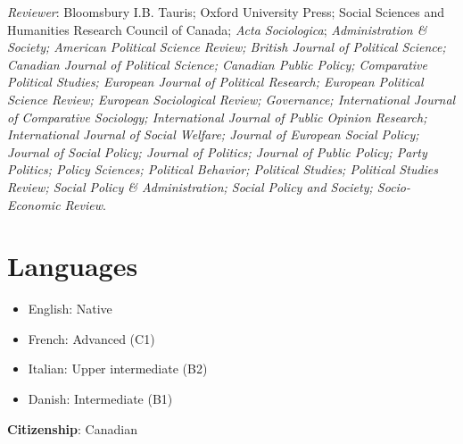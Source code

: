 \documentclass[letterpaper,fontsize=10.5pt]{scrartcl}
\begin{document}
{}\textit{Reviewer}: Bloomsbury I.B. Tauris; Oxford University Press; Social Sciences and Humanities Research Council of Canada; \textit{Acta Sociologica}; \textit{Administration \& Society; American Political Science Review; British Journal of Political Science; Canadian Journal of Political Science; Canadian Public Policy; Comparative Political Studies; European Journal of Political Research; European Political Science Review; European Sociological Review; Governance; International Journal of Comparative Sociology; International Journal of Public Opinion Research; International Journal of Social Welfare; Journal of European Social Policy; Journal of Social Policy; Journal of Politics; Journal of Public Policy; Party Politics; Policy Sciences; Political Behavior; Political Studies; Political Studies Review; Social Policy \& Administration; Social Policy and Society; Socio-Economic Review}.

\section{Languages}
\begin{itemize}[itemsep=0em, topsep=0em, partopsep=0em]
	\item English: Native
	\item French: Advanced (C1)
	\item Italian: Upper intermediate (B2)
	\item Danish: Intermediate (B1)\\
\end{itemize}

{}\textbf{Citizenship}: Canadian

\end{document}
